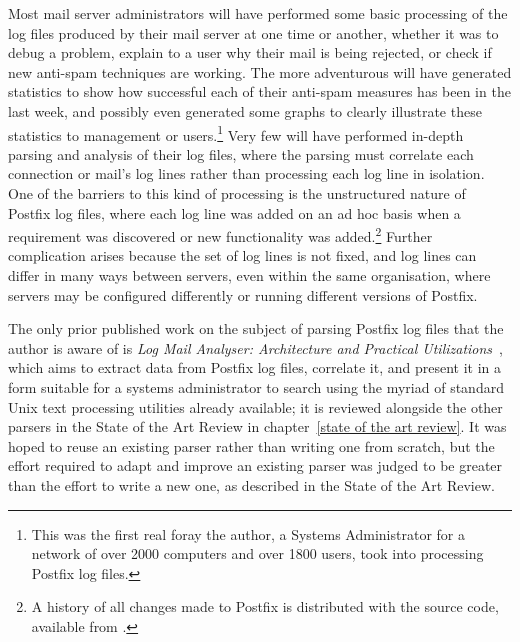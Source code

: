 Most mail server administrators will have performed some basic processing
of the log files produced by their mail server at one time or another,
whether it was to debug a problem, explain to a user why their mail is
being rejected, or check if new anti-spam techniques are working.  The more
adventurous will have generated statistics to show how successful each of
their anti-spam measures has been in the last week, and possibly even
generated some graphs to clearly illustrate these statistics to management
or users.\footnote{This was the first real foray the author, a Systems
Administrator for a network of over 2000 computers and over 1800 users,
took into processing Postfix log files.}  Very few will have performed
in-depth parsing and analysis of their log files, where the parsing must
correlate each connection or mail's log lines rather than
processing each log line in isolation.  One of the barriers to this kind of
processing is the unstructured nature of Postfix log files, where each log
line was added on an ad hoc basis when a requirement was discovered or new
functionality was added.\footnote{A history of all changes made to Postfix
is distributed with the source code, available from
.}  Further
complication arises because the set of log lines is not fixed, and log
lines can differ in many ways between servers, even within the same
organisation, where servers may be configured differently or running
different versions of Postfix.

The only prior published work on the subject of parsing Postfix log files
that the author is aware of is \textit{Log Mail Analyser: Architecture and
Practical Utilizations\/}~\cite{log-mail-analyser}, which aims to extract
data from Postfix log files, correlate it, and present it in a form
suitable for a systems administrator to search using the myriad of standard
Unix text processing utilities already available; it is reviewed alongside
the other parsers in the State of the Art Review in chapter~\ref{state of
the art review}.  It was hoped to reuse an existing parser rather than
writing one from scratch, but the effort required to adapt and improve an
existing parser was judged to be greater than the effort to write a new
one, as described in the State of the Art Review.

